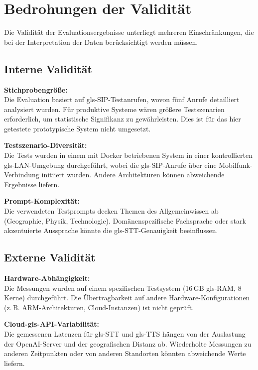 \section{Bedrohungen der Validität}
\label{sec:threats-to-validity}

Die Validität der Evaluationsergebnisse unterliegt mehreren Einschränkungen, die bei der Interpretation der Daten berücksichtigt werden müssen.

\subsection{Interne Validität}
\textbf{Stichprobengrö\ss e:}\\
Die Evaluation basiert auf \gls{gls-SIP}-Testanrufen, wovon fünf Anrufe detailliert analysiert wurden. Für produktive Systeme wären grö\ss ere Testszenarien erforderlich, um statistische Signifikanz zu gewährleisten. Dies ist für das hier getestete prototypische System nicht umgesetzt.

\textbf{Testszenario-Diversität:}\\
Die Tests wurden in einem mit Docker betriebenen System in einer kontrollierten \gls{gls-LAN}-Umgebung durchgeführt, wobei die \gls{gls-SIP}-Anrufe über eine Mobilfunk-Verbindung initiiert wurden. Andere Architekturen können abweichende Ergebnisse liefern.

\textbf{Prompt-Komplexität:}\\
Die verwendeten Testprompts decken Themen des Allgemeinwissen ab (Geographie,
Physik, Technologie). Domänenspezifische Fachsprache oder stark akzentuierte Aussprache könnte die \gls{gls-STT}-Genauigkeit beeinflussen.

\subsection{Externe Validität}
\textbf{Hardware-Abhängigkeit:}\\
Die Messungen wurden auf einem spezifischen Testsystem (16\,GB \gls{gls-RAM},
8 Kerne) durchgeführt. Die Übertragbarkeit auf andere Hardware-Konfigurationen (z.\,B. ARM-Architekturen, Cloud-Instanzen) ist nicht geprüft.

\textbf{Cloud-\gls{gls-API}-Variabilität:}\\
Die gemessenen Latenzen für \gls{gls-STT} und
\gls{gls-TTS} hängen von der Auslastung der OpenAI-Server und der geografischen Distanz ab. Wiederholte Messungen zu anderen Zeitpunkten oder von anderen Standorten könnten abweichende Werte liefern.


